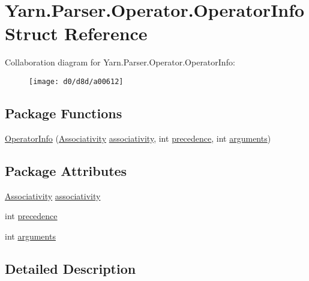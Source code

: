 \hypertarget{a00116}{\section{Yarn.\-Parser.\-Operator.\-Operator\-Info Struct Reference}
\label{a00116}
}


Collaboration diagram for Yarn.\-Parser.\-Operator.\-Operator\-Info\-:
\nopagebreak
\begin{figure}[H]
\begin{center}
\leavevmode
\texttt{[image: d0/d8d/a00612]}
\end{center}
\end{figure}
\subsection*{Package Functions}
\begin{DoxyCompactItemize}
\item 
\hyperlink{a00116_a25faca62235c9f8542e4a071ba8ebc0b}{Operator\-Info} (\hyperlink{a00115_a83fa1b8db0e6678006920812b6f33f62}{Associativity} \hyperlink{a00116_accba40a72d9709ca3c18810b8661afe3}{associativity}, int \hyperlink{a00116_a0b2921d7b863e268d33aa15213395093}{precedence}, int \hyperlink{a00116_a0758c6f7dac4b205f616b43b1af95b95}{arguments})
\end{DoxyCompactItemize}
\subsection*{Package Attributes}
\begin{DoxyCompactItemize}
\item 
\hyperlink{a00115_a83fa1b8db0e6678006920812b6f33f62}{Associativity} \hyperlink{a00116_accba40a72d9709ca3c18810b8661afe3}{associativity}
\item 
int \hyperlink{a00116_a0b2921d7b863e268d33aa15213395093}{precedence}
\item 
int \hyperlink{a00116_a0758c6f7dac4b205f616b43b1af95b95}{arguments}
\end{DoxyCompactItemize}


\subsection{Detailed Description}


